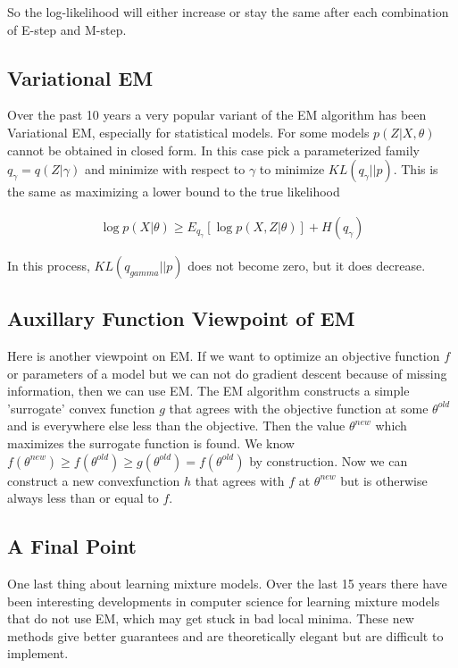 \documentclass[11pt]{article}
\begin{document}
So the log-likelihood will either increase or stay the same after each combination of E-step and M-step.

\subsection{Variational EM}

Over the past 10 years a very popular variant of the EM algorithm has been Variational EM, especially for statistical models.  For some models $p(Z|X,\theta)$ cannot be obtained in closed form.  In this case pick a parameterized family $q_{\gamma}=q(Z|\gamma)$ and minimize with respect to $\gamma$ to minimize $KL(q_{\gamma}||p)$.  This is the same as maximizing a lower bound to the true likelihood

\begin{align}
\log p(X|\theta) \geq E_{q_{\gamma}}[\log p(X,Z|\theta)] + H(q_{\gamma})
\end{align}

In this process, $KL(q_{gamma}||p)$ does not become zero, but it does decrease.

\subsection{Auxillary Function Viewpoint of EM}

Here is another viewpoint on EM.  If we want to optimize an objective function $f$ or parameters of a model but we can not do gradient descent because of missing information, then we can use EM.  The EM algorithm constructs a simple 'surrogate' convex function $g$ that agrees with the objective function at some $\theta^{old}$ and is everywhere else less than the objective.  Then the value $\theta^{new}$ which maximizes the surrogate function is found.  We know $f(\theta^{new}) \ge f(\theta^{old}) \ge g(\theta^{old}) = f(\theta^{old})$ by construction.  Now we can construct a new convexfunction $h$ that agrees with $f$ at $\theta^{new}$ but is otherwise always less than or equal to $f$.

\subsection{A Final Point}

One last thing about learning mixture models.  Over the last 15 years there have been interesting developments in computer science for learning mixture models that do not use EM, which may get stuck in bad local minima.  These new methods give better guarantees and are theoretically elegant but are difficult to implement.
\end{document}
